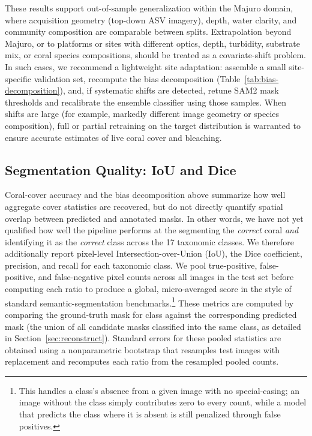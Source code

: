 \documentclass[11pt]{elsarticle}
\begin{document}
These results support out-of-sample generalization within the Majuro domain, where acquisition geometry (top-down ASV imagery), depth, water clarity, and community composition are comparable between splits. Extrapolation beyond Majuro, or to platforms or sites with different optics, depth, turbidity, substrate mix, or coral species compositions, should be treated as a covariate-shift problem. In such cases, we recommend a lightweight site adaptation: assemble a small site-specific validation set, recompute the bias decomposition (Table~\ref{tab:bias-decomposition}), and, if systematic shifts are detected, retune SAM2 mask thresholds and recalibrate the ensemble classifier using those samples. When shifts are large (for example, markedly different image geometry or species composition), full or partial retraining on the target distribution is warranted to ensure accurate estimates of live coral cover and bleaching.

\subsection{Segmentation Quality: IoU and Dice}
\label{sec:iou_dice}

Coral-cover accuracy and the bias decomposition above summarize how well aggregate cover statistics are recovered, but do not directly quantify spatial overlap between predicted and annotated masks. In other words, we have not yet qualified how well the pipeline performs at the segmenting the \emph{correct} coral \emph{and} identifying it as the \emph{correct} class across the 17 taxonomic classes. We therefore additionally report pixel-level Intersection-over-Union (IoU), the Dice coefficient, precision, and recall for each taxonomic class.
We pool true-positive, false-positive, and false-negative pixel counts across all images in the test set before computing each ratio to produce a global, micro-averaged score in the style of standard semantic-segmentation benchmarks.\footnote{This handles a class's absence from a given image with no special-casing; an image without the class simply contributes zero to every count, while a model that predicts the class where it is absent is still penalized through false positives.} These metrics are computed by comparing the ground-truth mask for class against the corresponding predicted mask (the union of all candidate masks classified into the same class, as detailed in Section~\ref{sec:reconstruct}). Standard errors for these pooled statistics are obtained using a nonparametric bootstrap that resamples test images with replacement and recomputes each ratio from the resampled pooled counts.
\end{document}

